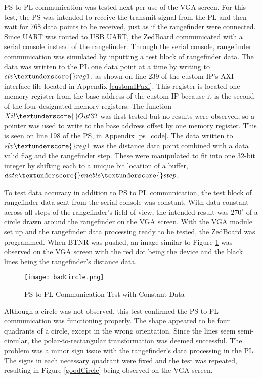 PS to PL communication was tested next per use of the VGA screen. For this test, the PS was intended to receive the transmit signal from the PL and then wait for 768 data points to be received, just as if the rangefinder were connected. Since UART was routed to USB UART, the ZedBoard communicated with a serial console instead of the rangefinder. Through the serial console, rangefinder communication was simulated by inputting a test block of rangefinder data. The data was written to the PL one data point at a time by writing to $slv\textunderscore{}reg1$, as shown on line 239 of the custom IP's AXI interface file located in Appendix \ref{customIPaxi}. This register is located one memory register from the base address of the custom IP because it is the second of the four designated memory registers. The function $Xil\textunderscore{}Out32$ was first tested but no results were observed, so a pointer was used to write to the base address offset by one memory register. This is seen on line 198 of the PS, in Appendix \ref{ps_code}. The data written to $slv\textunderscore{}reg1$ was the distance data point combined with a data valid flag and the rangefinder step. These were manipulated to fit into one 32-bit integer by shifting each to a unique bit location of a buffer, $data\textunderscore{}enable\textunderscore{}step$.
\par
To test data accuracy in addition to PS to PL communication, the test block of rangefinder data sent from the serial console was constant. With data constant across all steps of the rangefinder's field of view, the intended result was $270^\circ$ of a circle drawn around the rangefinder on the VGA screen. With the VGA module set up and the rangefinder data processing ready to be tested, the ZedBoard was programmed. When BTNR was pushed, an image similar to Figure \ref{badCircle} was observed on the VGA screen with the red dot being the device and the black lines being the rangefinder's distance data.

\begin{figure}[H]
	\centerline{\texttt{[image: badCircle.png]}}
	\caption{PS to PL Communication Test with Constant Data}
	\label{badCircle}
\end{figure}

Although a circle was not observed, this test confirmed the PS to PL communication was functioning properly. The shape appeared to be four quadrants of a circle, except in the wrong orientation. Since the lines seem semi-circular, the polar-to-rectangular transformation was deemed successful. The problem was a minor sign issue with the rangefinder's data processing in the PL. The signs in each necessary quadrant were fixed and the test was repeated, resulting in Figure \ref{goodCircle} being observed on the VGA screen.

